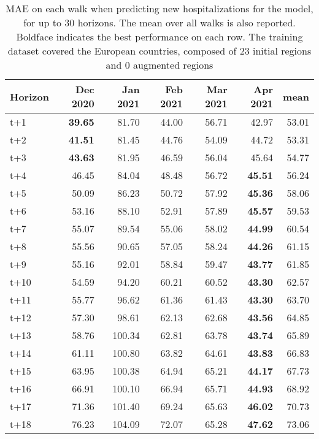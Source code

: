 \begin{table}[H]
\centering
\caption{MAE on each walk when predicting new hospitalizations for the model, for up to 30 horizons. The mean over all walks is also reported. Boldface indicates the best performance on each row. The training dataset covered the European countries, composed of 23 initial regions and 0 augmented regions }
\label{tab:MAE_walk_encoder_decoder}
\begin{tabular}{lrrrrrr}
\toprule
Horizon &  Dec 2020 &  Jan 2021 &  Feb 2021 &  Mar 2021 &  Apr 2021 &  mean \\
\midrule
t+1  & \textbf{39.65}  & 81.70  & 44.00  & 56.71  & 42.97  & 53.01  \\
t+2  & \textbf{41.51}  & 81.45  & 44.76  & 54.09  & 44.72  & 53.31  \\
t+3  & \textbf{43.63}  & 81.95  & 46.59  & 56.04  & 45.64  & 54.77  \\
t+4  & 46.45  & 84.04  & 48.48  & 56.72  & \textbf{45.51}  & 56.24  \\
t+5  & 50.09  & 86.23  & 50.72  & 57.92  & \textbf{45.36}  & 58.06  \\
t+6  & 53.16  & 88.10  & 52.91  & 57.89  & \textbf{45.57}  & 59.53  \\
t+7  & 55.07  & 89.54  & 55.06  & 58.02  & \textbf{44.99}  & 60.54  \\
t+8  & 55.56  & 90.65  & 57.05  & 58.24  & \textbf{44.26}  & 61.15  \\
t+9  & 55.16  & 92.01  & 58.84  & 59.47  & \textbf{43.77}  & 61.85  \\
t+10  & 54.59  & 94.20  & 60.21  & 60.52  & \textbf{43.30}  & 62.57  \\
t+11  & 55.77  & 96.62  & 61.36  & 61.43  & \textbf{43.30}  & 63.70  \\
t+12  & 57.30  & 98.61  & 62.13  & 62.68  & \textbf{43.56}  & 64.85  \\
t+13  & 58.76  & 100.34  & 62.81  & 63.78  & \textbf{43.74}  & 65.89  \\
t+14  & 61.11  & 100.80  & 63.82  & 64.61  & \textbf{43.83}  & 66.83  \\
t+15  & 63.95  & 100.38  & 64.94  & 65.21  & \textbf{44.17}  & 67.73  \\
t+16  & 66.91  & 100.10  & 66.94  & 65.71  & \textbf{44.93}  & 68.92  \\
t+17  & 71.36  & 101.40  & 69.24  & 65.63  & \textbf{46.02}  & 70.73  \\
t+18  & 76.23  & 104.09  & 72.07  & 65.28  & \textbf{47.62}  & 73.06  \\

\end{tabular}
\end{table}
